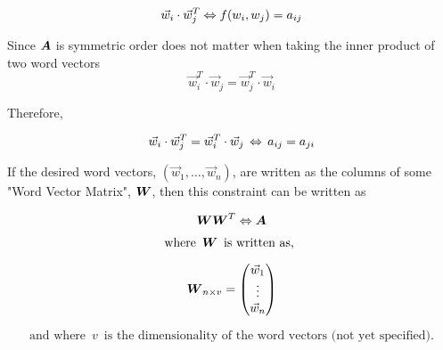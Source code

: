 \documentclass{article}
\begin{document}
		\begin{equation*}
			\vec{w}_{i} \cdot \vec{w}_{j}^T \logeq f(w_i,w_j) = a_{ij}
		\end{equation*}
		
Since $\boldsymbol{A}$ is symmetric order does not matter when taking the inner product of two word vectors
		\begin{equation*}
			\vec{w}_{i}^T \cdot \vec{w}_{j} = \vec{w}_{j}^T \cdot \vec{w}_{i}
		\end{equation*}
		
		Therefore,
		
		\begin{equation*}
			\vec{w}_{i} \cdot \vec{w}_{j}^T = \vec{w}_{i}^T \cdot \vec{w}_{j} \, \logeq \, a_{ij} = a_{ji}
		\end{equation*}
		
		If the desired word vectors, $\left( \vec{w}_{1}, \ldots, \vec{w}_{n} \right)$, are written as the columns of some "Word Vector Matrix", $\boldsymbol{W}$, then this constraint can be written as
		
		\begin{equation*}
			\mate{W}\mate{W}^T \logeq \mate{A}
		\end{equation*}
		
		\begin{equation*}
			\text{where } \, \boldsymbol{W} \, \text{ is written as, }
		\end{equation*}
		
		\begin{equation*}
			\boldsymbol{{W}}_{{n} \times {v}} = 
			\begin{pmatrix}
				\vec{w}_{1} \\
				\vdots \\
				\vec{w}_{n}
			\end{pmatrix}
		\end{equation*}
		
		\begin{equation*}
			\text{and where } \, v \, \text{ is the dimensionality of the word vectors (not yet specified).}
		\end{equation*}




%
%
\end{document}
